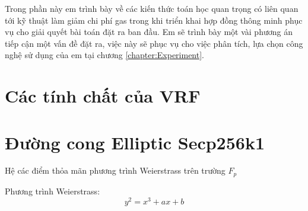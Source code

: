 \documentclass[../main.tex]{subfiles}
\begin{document}
Trong phần này em trình bày về các kiến thức toán học quan trọng có liên quan tới kỹ thuật làm giảm chi phí gas trong khi triển khai hợp đồng thông minh phục vụ cho giải quyết bài toán đặt ra ban đầu. Em sẽ trình bày một vài phương án tiếp cận một vấn đề đặt ra, việc này sẽ phục vụ cho việc phân tích, lựa chọn công nghệ sử dụng của em tại chương \ref{chapter:Experiment}.
\section{Các tính chất của VRF}


\section{Đường cong Elliptic Secp256k1}
\label{appendix:secp256k1}
Hệ các điểm thỏa mãn phương trình Weierstrass trên trường $F_p$

Phương trình Weierstrass:
\begin{equation*}
    y^2 = x^3 + ax +b
\end{equation*}
\end{document}
